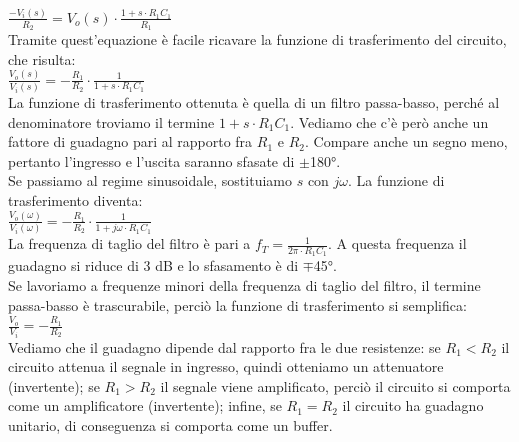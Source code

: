 \documentclass{report}
\begin{document}
\\[2pt]\indent $\displaystyle{\frac{-V_i(s)}{R_2}=V_o(s)\cdot\frac{1+s\cdot R_1C_1}{R_1}}$
\\[2pt]Tramite quest'equazione è facile ricavare la funzione di trasferimento del circuito, che risulta:
\\[2pt]\indent $\displaystyle{\frac{V_o(s)}{V_i(s)}=-\frac{R_1}{R_2}\cdot\frac{1}{1+s\cdot R_1C_1}}$
\\[2pt]La funzione di trasferimento ottenuta è quella di un filtro passa-basso, perché al denominatore troviamo il termine $1+s\cdot R_1C_1$. Vediamo che c'è però anche un fattore di guadagno pari al rapporto fra $R_1$ e $R_2$. Compare anche un segno meno, pertanto l'ingresso e l'uscita saranno sfasate di $\displaystyle\pm$180°.
\\Se passiamo al regime sinusoidale, sostituiamo $s$ con $j\omega$. La funzione di trasferimento diventa:
\\[2pt]\indent $\displaystyle{\frac{V_o(\omega)}{V_i(\omega)}=-\frac{R_1}{R_2}\cdot\frac{1}{1+j\omega\cdot R_1C_1}}$
\\[2pt]La frequenza di taglio del filtro è pari a $\displaystyle{f_T=\frac{1}{2\pi\cdot R_1C_1}}$. A questa frequenza il guadagno si riduce di 3 dB e lo sfasamento è di $\mp$45°.
\\[2pt]Se lavoriamo a frequenze minori della frequenza di taglio del filtro, il termine passa-basso è trascurabile, perciò la funzione di trasferimento si semplifica:
\\[2pt]\indent$\displaystyle{\frac{V_o}{V_i}=-\frac{R_1}{R_2}}$
\\[2pt]Vediamo che il guadagno dipende dal rapporto fra le due resistenze: se $R_1<R_2$ il circuito attenua il segnale in ingresso, quindi otteniamo un attenuatore (invertente); se $R_1>R_2$ il segnale viene amplificato, perciò il circuito si comporta come un amplificatore (invertente); infine, se $R_1=R_2$ il circuito ha guadagno unitario, di conseguenza si comporta come un buffer. 
\end{document}
